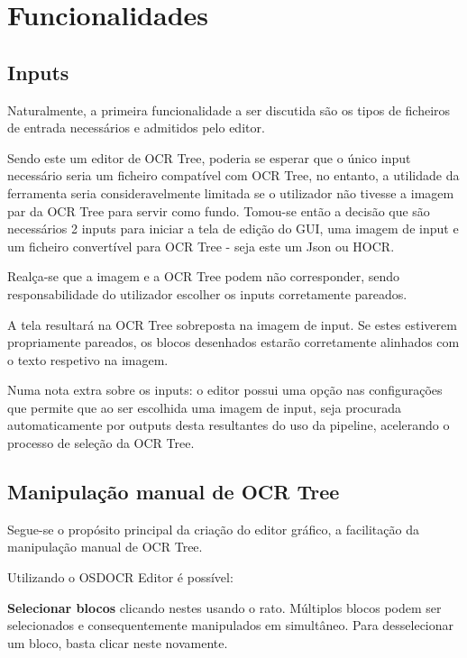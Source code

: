 \section{Funcionalidades}

\subsection{Inputs}

Naturalmente, a primeira funcionalidade a ser discutida são os tipos de ficheiros de entrada necessários e admitidos pelo editor.

Sendo este um editor de OCR Tree, poderia se esperar que o único input necessário seria um ficheiro compatível com OCR Tree, no entanto, a utilidade da ferramenta seria consideravelmente limitada se o utilizador não tivesse a imagem par da OCR Tree para servir como fundo. Tomou-se então a decisão que são necessários 2 inputs para iniciar a tela de edição do GUI, uma imagem de input e um ficheiro convertível para OCR Tree - seja este um Json ou HOCR.

Realça-se que a imagem e a OCR Tree podem não corresponder, sendo responsabilidade do utilizador escolher os inputs corretamente pareados. 

A tela resultará na OCR Tree sobreposta na imagem de input. Se estes estiverem propriamente pareados, os blocos desenhados estarão corretamente alinhados com o texto respetivo na imagem.




Numa nota extra sobre os inputs: o editor possui uma opção nas configurações que permite que ao ser escolhida uma imagem de input, seja procurada automaticamente por outputs desta resultantes do uso da pipeline, acelerando o processo de seleção da OCR Tree.


\subsection{Manipulação manual de OCR Tree}

Segue-se o propósito principal da criação do editor gráfico, a facilitação da manipulação manual de OCR Tree.

Utilizando o OSDOCR Editor é possível:

\textbf{Selecionar blocos} clicando nestes usando o rato. Múltiplos blocos podem ser selecionados e consequentemente manipulados em simultâneo. Para desselecionar um bloco, basta clicar neste novamente.

